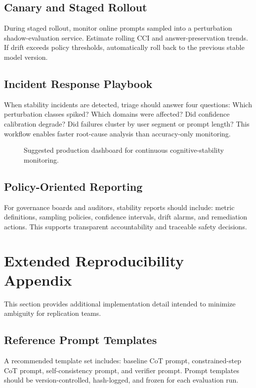 \documentclass[conference]{IEEEtran}
\begin{document}
\subsection{Canary and Staged Rollout}
During staged rollout, monitor online prompts sampled into a perturbation shadow-evaluation service. Estimate rolling CCI and answer-preservation trends. If drift exceeds policy thresholds, automatically roll back to the previous stable model version.

\subsection{Incident Response Playbook}
When stability incidents are detected, triage should answer four questions: Which perturbation classes spiked? Which domains were affected? Did confidence calibration degrade? Did failures cluster by user segment or prompt length? This workflow enables faster root-cause analysis than accuracy-only monitoring.

\begin{figure}[!t]
\centering
{}
\caption{Suggested production dashboard for continuous cognitive-stability monitoring.}
\label{fig:ops-dashboard}
\end{figure}

\subsection{Policy-Oriented Reporting}
For governance boards and auditors, stability reports should include: metric definitions, sampling policies, confidence intervals, drift alarms, and remediation actions. This supports transparent accountability and traceable safety decisions.

\section{Extended Reproducibility Appendix}
This section provides additional implementation detail intended to minimize ambiguity for replication teams.

\subsection{Reference Prompt Templates}
A recommended template set includes: baseline CoT prompt, constrained-step CoT prompt, self-consistency prompt, and verifier prompt. Prompt templates should be version-controlled, hash-logged, and frozen for each evaluation run.
\end{document}
